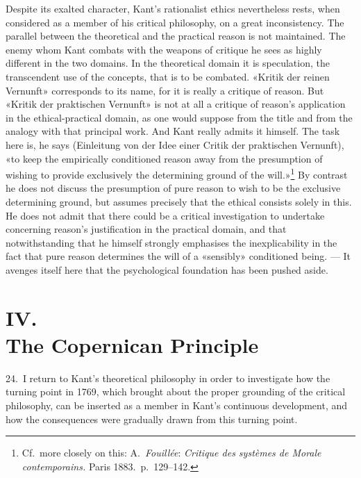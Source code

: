 \documentclass[12pt,a4paper]{article}
\newcommand{\opage}[1]{\marginnote{\footnotesize\textit{[#1]}}}
\begin{document}
Despite its exalted character, Kant's rationalist ethics nevertheless rests,
when considered as a member of his critical philosophy, on a great
inconsistency. The parallel between the theoretical and the practical reason
is not maintained. The enemy whom Kant combats with the weapons of critique
he sees as highly different in the two domains. In the theoretical domain it
is speculation, the transcendent use of the concepts, that is to be combated.
«Kritik der reinen Vernunft» corresponds to its name, for it is really a
critique of reason. But «Kritik der praktischen Vernunft» is not at all a
critique of reason's application in the ethical-practical domain, as one
would suppose from the title and from the analogy with that principal work.
And Kant really admits it himself. The task here is, he says (Einleitung von
der Idee einer Critik der praktischen Vernunft), «to keep the empirically
conditioned reason away from the presumption of wishing to provide
exclusively the determining ground of the will.»\footnote{Cf.\ more closely
on this: A.\ \emph{Fouillée}: \textit{Critique des systèmes de Morale
contemporains.} Paris 1883.\ p.\ 129--142.} By contrast he does not discuss
the presumption of pure reason to wish to be the exclusive determining
ground, but assumes precisely that the ethical consists solely in this. He
does not admit that there could be a critical investigation to undertake
concerning reason's justification in the practical domain, and that
notwithstanding that he himself strongly emphasises the inexplicability in
the fact that pure reason determines the will of a «sensibly» conditioned
being. --- It avenges itself here that the psychological foundation has been
pushed aside.

\section*{IV.\\ The Copernican Principle}

\noindent \opage{47}24.\ I return to Kant's theoretical philosophy in order to
investigate how the turning point in 1769, which brought about the proper
grounding of the critical philosophy, can be inserted as a member in Kant's
continuous development, and how the consequences were gradually drawn from
this turning point.
\end{document}
